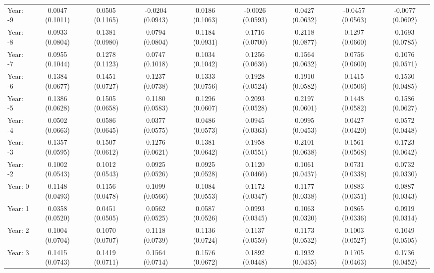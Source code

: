 \begin{tabular}{lcccccccc}
   Year: -9                            & 0.0047 (0.1011)  & 0.0505 (0.1165)  & -0.0204 (0.0943) & 0.0186 (0.1063)  & -0.0026 (0.0593) & 0.0427 (0.0632)  & -0.0457 (0.0563) & -0.0077 (0.0602)\\   
   Year: -8                            & 0.0933 (0.0804)  & 0.1381 (0.0980)  & 0.0794 (0.0804)  & 0.1184 (0.0931)  & 0.1716 (0.0700)  & 0.2118 (0.0877)  & 0.1297 (0.0660)  & 0.1693 (0.0785)\\   
   Year: -7                            & 0.0955 (0.1044)  & 0.1278 (0.1123)  & 0.0747 (0.1018)  & 0.1034 (0.1042)  & 0.1256 (0.0636)  & 0.1564 (0.0632)  & 0.0756 (0.0600)  & 0.1076 (0.0571)\\   
   Year: -6                            & 0.1384 (0.0677)  & 0.1451 (0.0727)  & 0.1237 (0.0738)  & 0.1333 (0.0756)  & 0.1928 (0.0524)  & 0.1910 (0.0582)  & 0.1415 (0.0506)  & 0.1530 (0.0485)\\   
   Year: -5                            & 0.1386 (0.0628)  & 0.1505 (0.0658)  & 0.1180 (0.0583)  & 0.1296 (0.0607)  & 0.2093 (0.0528)  & 0.2197 (0.0601)  & 0.1448 (0.0582)  & 0.1586 (0.0627)\\   
   Year: -4                            & 0.0502 (0.0663)  & 0.0586 (0.0645)  & 0.0377 (0.0575)  & 0.0486 (0.0573)  & 0.0945 (0.0363)  & 0.0995 (0.0453)  & 0.0427 (0.0420)  & 0.0572 (0.0448)\\   
   Year: -3                            & 0.1357 (0.0595)  & 0.1507 (0.0612)  & 0.1276 (0.0621)  & 0.1381 (0.0642)  & 0.1958 (0.0551)  & 0.2101 (0.0638)  & 0.1561 (0.0568)  & 0.1723 (0.0642)\\   
   Year: -2                            & 0.1002 (0.0543)  & 0.1012 (0.0543)  & 0.0925 (0.0526)  & 0.0925 (0.0528)  & 0.1120 (0.0466)  & 0.1061 (0.0437)  & 0.0731 (0.0338)  & 0.0732 (0.0330)\\   
   Year: 0                             & 0.1148 (0.0493)  & 0.1156 (0.0478)  & 0.1099 (0.0566)  & 0.1084 (0.0553)  & 0.1172 (0.0347)  & 0.1177 (0.0338)  & 0.0883 (0.0351)  & 0.0887 (0.0343)\\   
   Year: 1                             & 0.0358 (0.0520)  & 0.0451 (0.0505)  & 0.0562 (0.0525)  & 0.0587 (0.0526)  & 0.0993 (0.0345)  & 0.1063 (0.0320)  & 0.0865 (0.0336)  & 0.0919 (0.0314)\\   
   Year: 2                             & 0.1004 (0.0704)  & 0.1070 (0.0707)  & 0.1118 (0.0739)  & 0.1136 (0.0724)  & 0.1137 (0.0559)  & 0.1173 (0.0532)  & 0.1003 (0.0527)  & 0.1049 (0.0505)\\   
   Year: 3                             & 0.1415 (0.0743)  & 0.1419 (0.0711)  & 0.1564 (0.0714)  & 0.1576 (0.0672)  & 0.1892 (0.0448)  & 0.1932 (0.0435)  & 0.1705 (0.0463)  & 0.1736 (0.0452)\\   

\end{tabular}
